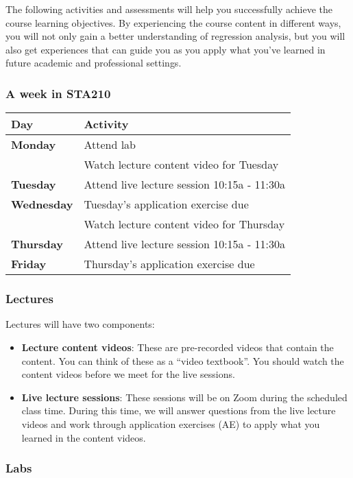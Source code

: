 \documentclass[
]{article}
\begin{document}
The following activities and assessments will help you successfully
achieve the course learning objectives. By experiencing the course
content in different ways, you will not only gain a better understanding
of regression analysis, but you will also get experiences that can guide
you as you apply what you've learned in future academic and professional
settings.

\hypertarget{a-week-in-sta210}{%
\subsubsection{A week in STA210}\label{a-week-in-sta210}}

\begin{longtable}[]{@{}ll@{}}
\toprule
\textbf{Day} & \textbf{Activity}\tabularnewline
\midrule
\endhead
\textbf{Monday} & Attend lab\tabularnewline
& Watch lecture content video for Tuesday\tabularnewline
\textbf{Tuesday} & Attend live lecture session 10:15a -
11:30a\tabularnewline
\textbf{Wednesday} & Tuesday's application exercise due\tabularnewline
& Watch lecture content video for Thursday\tabularnewline
\textbf{Thursday} & Attend live lecture session 10:15a -
11:30a\tabularnewline
\textbf{Friday} & Thursday's application exercise due\tabularnewline
\bottomrule
\end{longtable}

\hypertarget{lectures}{%
\subsubsection{Lectures}\label{lectures}}

Lectures will have two components:

\begin{itemize}
\item
  \textbf{Lecture content videos}: These are pre-recorded videos that
  contain the content. You can think of these as a ``video textbook''.
  You should watch the content videos before we meet for the live
  sessions.
\item
  \textbf{Live lecture sessions}: These sessions will be on Zoom during
  the scheduled class time. During this time, we will answer questions
  from the live lecture videos and work through application exercises
  (AE) to apply what you learned in the content videos.
\end{itemize}

\hypertarget{labs}{%
\subsubsection{Labs}\label{labs}}
\end{document}
